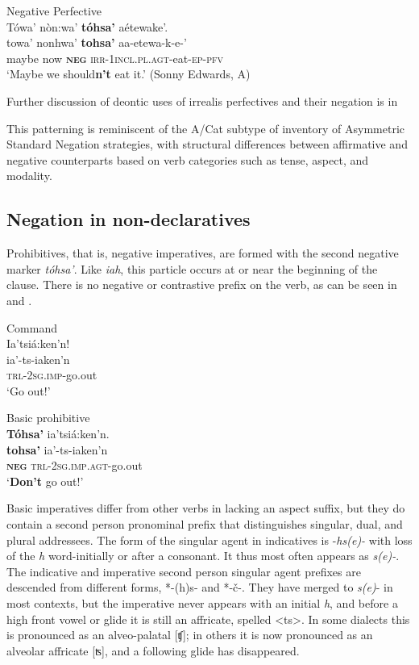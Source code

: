 \documentclass[output=paper,colorlinks,citecolor=brown]{langscibook}
\begin{document}
\ea\label{ex:moh:24}Negative Perfective\\
    \glll Tówa’ nòn:wa’ \textbf{tóhsa’} aétewake’.\\
         towa’ nonhwa’ \textbf{tohsa’} aa-etewa-k-e-’\\
         maybe now \textbf{\textsc{neg}} \textsc{irr-1incl.pl.agt}-eat-\textsc{ep-pfv}\\
    \glt ‘Maybe we should\textbf{n’t} eat it.’ (Sonny Edwards, A)
\z

Further discussion of deontic uses of irrealis perfectives and their negation is in 

This patterning is reminiscent of the A/Cat subtype of  inventory of Asymmetric Standard Negation strategies, with structural differences between affirmative and negative counterparts based on verb categories such as tense, aspect, and modality.

\subsection{Negation in non-declaratives}\label{sec:moh:2.2}

Prohibitives, that is, negative imperatives, are formed with the second negative marker \textit{tóhsa’}. Like \textit{iah}, this particle occurs at or near the beginning of the clause. There is no negative or contrastive prefix on the verb, as can be seen in  and .

{\ea\label{ex:moh:25}Command\\
    \glll Ia’tsiá:ken’n!\\
         ia’-ts-iaken’n\\
         \textsc{trl-2sg.imp}-go.out\\
    \glt ‘Go out!’
\z}


\ea\label{ex:moh:26}Basic prohibitive\\
    \glll \textbf{Tóhsa’} ia’tsiá:ken’n. \\
         \textbf{tohsa’} ia’-ts-iaken’n\\
         \textbf{\textsc{neg}} \textsc{trl-2sg.imp.agt}-go.out\\
    \glt ‘\textbf{Don’t} go out!’
\z

Basic imperatives differ from other verbs in lacking an aspect suffix, but they do contain a second person pronominal prefix that distinguishes singular, dual, and plural addressees. The form of the singular agent in indicatives is \nobreakdash-\textit{hs(e)-} with loss of the \textit{h} word-initially or after a consonant. It thus most often appears as \textit{s(e)-}. The indicative and imperative second person singular agent prefixes are descended from different forms, *-(h)s- and *-č-. They have merged to \textit{s(e)}{}- in most contexts, but the imperative never appears with an initial \textit{h}, and before a high front vowel or glide it is still an affricate, spelled <ts>. In some dialects this is pronounced as an alveo-palatal [ʧ]; in others it is now pronounced as an alveolar affricate [ʦ], and a following glide has disappeared.
\end{document}
